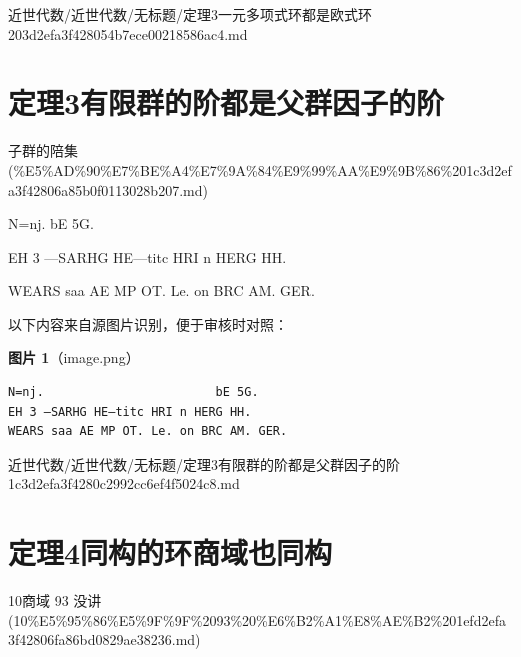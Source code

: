 \begin{note}[来源路径]

近世代数/近世代数/无标题/定理3一元多项式环都是欧式环 203d2efa3f428054b7ece00218586ac4.md

\end{note}

\section*{定理3有限群的阶都是父群因子的阶}

\begin{note}[来源上级主题]

子群的陪集 (\%E5\%AD\%90\%E7\%BE\%A4\%E7\%9A\%84\%E9\%99\%AA\%E9\%9B\%86\%201c3d2efa3f42806a85b0f0113028b207.md)

\end{note}

\begin{theorem}[定理3有限群的阶都是父群因子的阶]

N=nj.                        bE 5G.

EH 3 —SARHG HE—titc HRI n HERG HH.

WEARS saa AE MP OT. Le. on BRC AM. GER.

\end{theorem}

\begin{note}
以下内容来自源图片识别，便于审核时对照：

\textbf{图片 1}（image.png）
\begin{Verbatim}[fontsize=\small]
N=nj.                        bE 5G.
EH 3 —SARHG HE—titc HRI n HERG HH.
WEARS saa AE MP OT. Le. on BRC AM. GER.
\end{Verbatim}

\end{note}

\begin{note}[来源路径]

近世代数/近世代数/无标题/定理3有限群的阶都是父群因子的阶 1c3d2efa3f4280c2992cc6ef4f5024c8.md

\end{note}

\section*{定理4同构的环商域也同构}

\begin{note}[来源上级主题]

10商域 93 没讲 (10\%E5\%95\%86\%E5\%9F\%9F\%2093\%20\%E6\%B2\%A1\%E8\%AE\%B2\%201efd2efa3f42806fa86bd0829ae38236.md)

\end{note}

